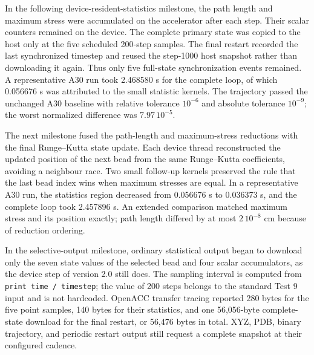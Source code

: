 In the following device-resident-statistics milestone, the path length and
maximum stress were accumulated on the accelerator after each step. Their
scalar counters remained on the device. The complete primary state was copied to
the host only at the five scheduled 200-step samples. The final restart recorded
the last synchronized timestep and reused the step-1000 host snapshot rather
than downloading it again. Thus only five full-state synchronization events
remained. A representative A30 run took
2.468580 s for the complete loop, of which 0.056676 s was attributed to the
small statistic kernels. The trajectory passed the unchanged A30 baseline
with relative tolerance $10^{-6}$ and absolute tolerance $10^{-9}$; the worst
normalized difference was $7.97\,10^{-5}$.

The next milestone fused the path-length and maximum-stress reductions with
the final Runge--Kutta state update. Each device thread reconstructed the
updated position of the next bead from the same Runge--Kutta coefficients,
avoiding a neighbour race. Two small follow-up kernels preserved the rule that
the last bead index wins when maximum stresses are equal. In a representative
A30 run, the statistics region decreased from 0.056676 s to 0.036373 s, and
the complete loop took 2.457896 s. An extended comparison matched maximum
stress and its position exactly; path length differed by at most
$2\,10^{-8}$ cm because of reduction ordering.

In the selective-output milestone, ordinary statistical output began to
download only the seven state values of the selected bead and four scalar
accumulators, as the device step of version 2.0 still does. The
sampling interval is computed from \texttt{print time / timestep}; the value
of 200 steps belongs to the standard Test 9 input and is not hardcoded. OpenACC
transfer tracing reported 280 bytes for the five point samples, 140 bytes for
their statistics, and one 56,056-byte complete-state download for the final
restart, or 56,476 bytes in total. XYZ, PDB, binary trajectory, and periodic
restart output still request a complete snapshot at their configured cadence.
